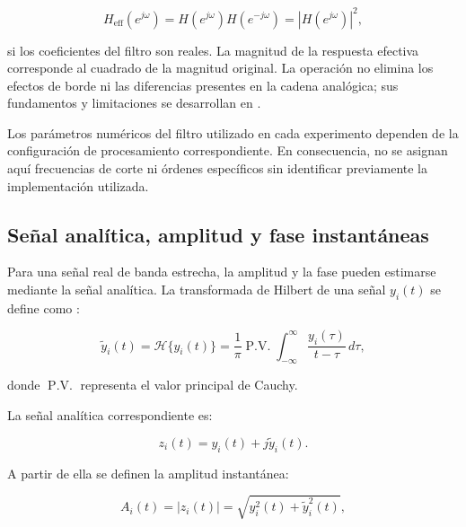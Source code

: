 \begin{equation}
    H_{\mathrm{eff}}(e^{j\omega})
    =
    H(e^{j\omega})H(e^{-j\omega})
    =
    |H(e^{j\omega})|^2,
    \label{eq:respuesta_bidireccional}
\end{equation}

si los coeficientes del filtro son reales. La magnitud de la respuesta
efectiva corresponde al cuadrado de la magnitud original. La operación
no elimina los efectos de borde ni las diferencias presentes en la
cadena analógica; sus fundamentos y limitaciones se desarrollan en
\cite{oppenheim1999discrete,lyons2010understanding}.

Los parámetros numéricos del filtro utilizado en cada experimento
dependen de la configuración de procesamiento correspondiente. En
consecuencia, no se asignan aquí frecuencias de corte ni órdenes
específicos sin identificar previamente la implementación utilizada.

\subsection*{Señal analítica, amplitud y fase instantáneas}

Para una señal real de banda estrecha, la amplitud y la fase pueden
estimarse mediante la señal analítica. La transformada de Hilbert de
una señal $y_i(t)$ se define como
\cite{gabor1946theory,cohen1995time}:

\begin{equation}
    \widetilde{y}_i(t)
    =
    \mathcal{H}\{y_i(t)\}
    =
    \frac{1}{\pi}
    \operatorname{P.V.}
    \int_{-\infty}^{\infty}
    \frac{y_i(\tau)}{t-\tau}\,d\tau,
    \label{eq:hilbert_integral}
\end{equation}

donde $\operatorname{P.V.}$ representa el valor principal de Cauchy.

La señal analítica correspondiente es:

\begin{equation}
    z_i(t)
    =
    y_i(t)+j\widetilde{y}_i(t).
    \label{eq:senal_analitica}
\end{equation}

A partir de ella se definen la amplitud instantánea:

\begin{equation}
    A_i(t)
    =
    |z_i(t)|
    =
    \sqrt{
        y_i^2(t)+\widetilde{y}_i^2(t)
    },
    \label{eq:amplitud_instantanea}
\end{equation}

